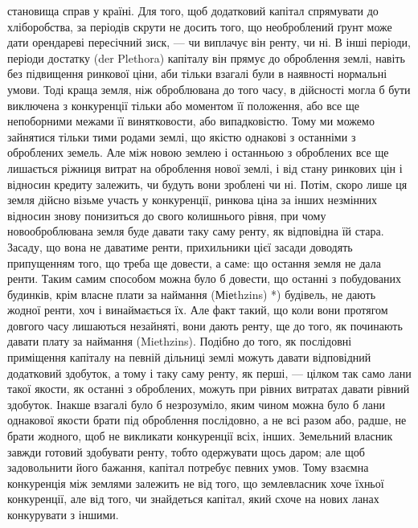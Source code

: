 становища справ у країні. Для того, щоб додатковий капітал спрямувати до
хліборобства, за періодів скрути не досить того, що необроблений ґрунт може
дати орендареві пересічний зиск, — чи виплачує він ренту, чи ні. В інші періоди,
періоди достатку (der Plethora) капіталу він прямує до оброблення землі, навіть
без підвищення ринкової ціни, аби тільки взагалі були в наявності нормальні
умови. Тоді краща земля, ніж оброблювана до того часу, в дійсності могла б
бути виключена з конкуренції тільки або моментом її положення, або все ще
непоборними межами її винятковости, або випадковістю. Тому ми можемо зайнятися
тільки тими родами землі, що якістю однакові з останніми з оброблених
земель. Але між новою землею і останньою з оброблених все ще лишається
ріжниця витрат на оброблення нової землі, і від стану ринкових цін і відносин
кредиту залежить, чи будуть вони зроблені чи ні. Потім, скоро лише ця земля
дійсно візьме участь у конкуренції, ринкова ціна за інших незмінних відносин
знову понизиться до свого колишнього рівня, при чому новооброблювана земля
буде давати таку саму ренту, як відповідна їй стара. Засаду, що вона не даватиме
ренти, прихильники цієї засади доводять припущенням того, що треба ще довести,
а саме: що остання земля не дала ренти. Таким самим способом можна було б довести,
що останні з побудованих будинків, крім власне плати за наймання (Міеthzins) *)
будівель, не дають жодної ренти, хоч і винаймається їх. Але факт такий,
що коли вони протягом довгого часу лишаються незайняті, вони дають ренту, ще
до того, як починають давати плату за наймання (Miethzins). Подібно до того,
як послідовні приміщення капіталу на певній дільниці землі можуть давати
відповідний додатковий здобуток, а тому і таку саму ренту, як перші, — цілком
так само лани такої якости, як останні з оброблених, можуть при рівних витратах
давати рівний здобуток. Інакше взагалі було б незрозуміло, яким чином
можна було б лани однакової якости брати під оброблення послідовно, а не
всі разом або, радше, не брати жодного, щоб не викликати конкуренції всіх,
інших. Земельний власник завжди готовий здобувати ренту, тобто одержувати
щось даром; але щоб задовольнити його бажання, капітал потребує певних
умов. Тому взаємна конкуренція між землями залежить не від того, що землевласник
хоче їхньої конкуренції, але від того, чи знайдеться капітал, який
схоче на нових ланах конкурувати з іншими.

